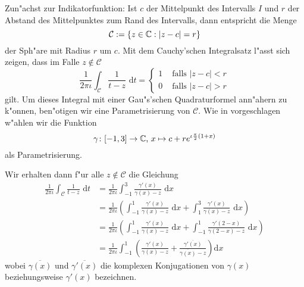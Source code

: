Zun"achst zur Indikatorfunktion: Ist $c$ der Mittelpunkt des Intervalls $I$ und
$r$ der Abstand des Mittelpunktes zum Rand des Intervalls, dann entspricht die Menge
\[
\mathcal{C} := \{z\in\mathbb{C} : |z-c| = r\}
\]
der Sph"are mit Radius $r$ um $c$. Mit dem Cauchy'schen Integralsatz
l"asst sich zeigen, dass im Falle $z\notin \mathcal{C}$
\[
\frac{1}{2\pi\iota}\int_{ \mathcal{C}}\frac{1}{t-z}\text{ d}t
= \begin{cases}1 &\text{ falls }|z-c| < r \\ 0 &\text{ falls }|z-c| > r \end{cases}
\]
gilt. Um dieses Integral mit einer Gau"s'schen Quadraturformel ann"ahern zu k"onnen, ben"otigen wir eine Parametrisierung von $\mathcal{C}$.
Wie in \cite{ptep} vorgeschlagen w"ahlen wir die Funktion
\[
\gamma\colon[-1,3]\to\mathbb{C}\text{, }
x\mapsto c+re^{\iota \frac{\pi}{2}(1+x)}
\]
als Parametrisierung.
\newpage

Wir erhalten dann f"ur alle $z\notin\mathcal{C}$ die Gleichung
\begin{align*}
\frac{1}{2\pi\iota}\int_{ \mathcal{C}}\frac{1}{t-z}\text{ d}t
&= \frac{1}{2\pi\iota} \int_{-1}^3 \frac{\gamma'(x)}{\gamma(x)-z}\text{ d}x \\
&= \frac{1}{2\pi\iota} \left( \int_{-1}^1 \frac{\gamma'(x)}{\gamma(x)-z} \text{ d}x +
\int_{1}^3\frac{\gamma'(x)}{\gamma(x)-z}\text{ d}x \right) \\
&= \frac{1}{2\pi\iota} \left( \int_{-1}^1 \frac{\gamma'(x)}{\gamma(x)-z} \text{ d}x +
\int_{-1}^1\frac{\gamma'(2-x)}{\gamma(2-x)-z}\text{ d}x \right) \\
&= \frac{1}{2\pi\iota} \int_{-1}^1 \left( \frac{\gamma'(x)}{\gamma(x)-z} +
\frac{\overline{\gamma'(x)}}{\overline{\gamma(x)}-z}\right)\text{d}x
\end{align*}
wobei $\overline{\gamma(x)}$ und $\overline{\gamma'(x)}$ die komplexen Konjugationen
von $\gamma(x)$ beziehungsweise $\gamma'(x)$ bezeichnen.\\

